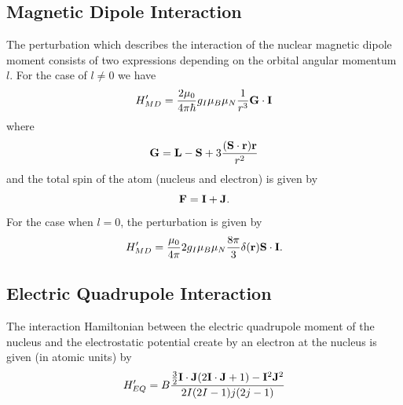 \documentclass[a4paper]{serif}
\begin{document}
    \subsection{Magnetic Dipole Interaction}
    The perturbation which describes the interaction of the nuclear magnetic dipole 
    moment consists of two expressions depending on the orbital angular momentum $l$.
    For the case of $l \neq 0$ we have
    \begin{displaymath}
        H'_{MD} = \frac{2\mu_0}{4 \pi \hbar} g_I \mu_B \mu_N \frac{1}{r^3}
                   {\bf G} \cdot {\bf I}
    \end{displaymath}
    where
    \begin{displaymath}
        {\bf G} = {\bf L} - {\bf S} + 3 \frac{({\bf S} \cdot {\bf r}) {\bf r}}{r^2}
    \end{displaymath}
    and the total spin of the atom (nucleus and electron) is given by
    \begin{displaymath}
        {\bf F} = {\bf I} + {\bf J}.
    \end{displaymath}
    For the case when $l = 0$, the perturbation is given by
    \begin{displaymath}
        H'_{MD}  =  \frac{\mu_0}{4\pi} 2g_I \mu_B \mu_N \frac{8 \pi}{3} 
               \delta({\bf r}) {\bf S} \cdot {\bf I}.
    \end{displaymath}

    \subsection{Electric Quadrupole Interaction}
    The interaction Hamiltonian between the electric quadrupole moment of the
    nucleus and the electrostatic potential create by an electron at the nucleus is 
    given (in atomic units) by
    \begin{displaymath}
        H'_{EQ} = B \frac{\frac{3}{2}{\bf I} \cdot {\bf J} (2{\bf I}\cdot {\bf J} + 1) - 
                        {\bf I}^2 {\bf J}^2} {2I(2I-1)j(2j-1)}    
    \end{displaymath}
\end{document}
